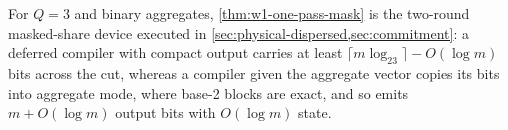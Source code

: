 For $Q=3$ and binary aggregates, \cref{thm:w1-one-pass-mask} is the
two-round masked-share device executed in
\cref{sec:physical-dispersed,sec:commitment}: a deferred compiler with
compact output carries at least $\lceil m\log_23\rceil-O(\log m)$ bits
across the cut, whereas a compiler given the aggregate vector copies its
bits into aggregate mode, where base-2 blocks are exact, and so emits
$m+O(\log m)$ output bits with $O(\log m)$ state.
